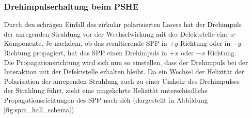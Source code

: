 \documentclass[a4paper, titlepage,  ngerman, fullpage]{book}
\begin{document}
	\subsubsection{Drehimpulserhaltung beim PSHE}
	Durch den schrägen Einfall des zirkular polarisierten Lasers hat der Drehimpuls der anregenden Strahlung vor der Wechselwirkung mit der Defektstelle eine $x$-Komponente. Je nachdem, ob das resultierende SPP in $+y$-Richtung oder in $-y$-Richtung propagiert, hat das SPP einen Drehimpuls in  $+x$ oder $-x$ Richtung. Die Propagationsrichtung wird sich nun so einstellen, dass der Drehimpuls bei der Interaktion mit der Defektstelle erhalten bleibt. Da ein Wechsel der Helizität der Polarisation der anregenden Strahlung auch zu einer Umkehr des Drehimpulses der Strahlung führt, zieht eine umgekehrte Helizität unterschiedliche Propagationsrichtungen des SPP nach sich (dargestellt in Abbildung \ref{fig:spin_hall_schema}).
\end{document}
